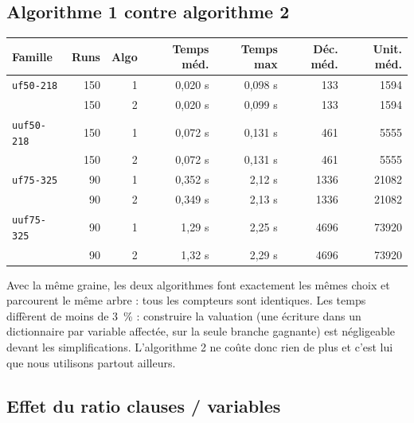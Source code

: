 \documentclass[11pt,a4paper]{article}
\begin{document}
\subsection{Algorithme 1 contre algorithme 2}

\begin{center}
\begin{tabular}{lrrrrrr}
  Famille & Runs & Algo & Temps méd. & Temps max & Déc. méd. & Unit. méd. \\
  \hline
  \texttt{uf50-218}  & 150 & 1 & 0,020 s & 0,098 s & 133 & 1594 \\
                     & 150 & 2 & 0,020 s & 0,099 s & 133 & 1594 \\
  \texttt{uuf50-218} & 150 & 1 & 0,072 s & 0,131 s & 461 & 5555 \\
                     & 150 & 2 & 0,072 s & 0,131 s & 461 & 5555 \\
  \texttt{uf75-325}  & 90  & 1 & 0,352 s & 2,12 s  & 1336 & 21082 \\
                     & 90  & 2 & 0,349 s & 2,13 s  & 1336 & 21082 \\
  \texttt{uuf75-325} & 90  & 1 & 1,29 s  & 2,25 s  & 4696 & 73920 \\
                     & 90  & 2 & 1,32 s  & 2,29 s  & 4696 & 73920 \\
\end{tabular}
\end{center}

Avec la même graine, les deux algorithmes font exactement les mêmes choix et
parcourent le même arbre : tous les compteurs sont identiques. Les temps
diffèrent de moins de 3~\% : construire la valuation (une écriture dans un
dictionnaire par variable affectée, sur la seule branche gagnante) est
négligeable devant les simplifications. L'algorithme 2 ne coûte donc rien
de plus et c'est lui que nous utilisons partout ailleurs.

\subsection{Effet du ratio clauses / variables}
\end{document}
